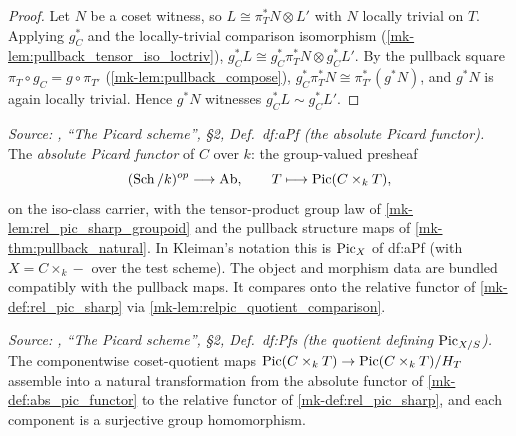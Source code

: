 \begin{proof}
  \leanok{}
  Let \(N\) be a coset witness, so \(L \cong \pi_T^* N \otimes L'\) with
  \(N\) locally trivial on \(T\). Applying \(g_C^*\) and the locally-trivial
  comparison isomorphism (\ref{mk-lem:pullback_tensor_iso_loctriv}),
  \(g_C^* L \cong g_C^* \pi_T^* N \otimes g_C^* L'\). By the pullback square
  \(\pi_T \circ g_C = g \circ \pi_{T'}\) (\ref{mk-lem:pullback_compose}),
  \(g_C^* \pi_T^* N \cong \pi_{T'}^* (g^* N)\), and \(g^* N\) is again
  locally trivial. Hence \(g^* N\) witnesses \(g_C^* L \sim g_C^* L'\).
\end{proof}

\begin{definition}\label{mk-def:abs_pic_functor}
  \leanok

  \textit{Source: \cite{kleiman-picard}, ``The Picard scheme'', \S 2, Def.~df:aPf
  (the absolute Picard functor).}
  The \emph{absolute Picard functor} of \(C\) over \(k\): the group-valued
  presheaf
  \[
    (\operatorname{Sch}/k)^{op} \longrightarrow \mathrm{Ab}, \qquad
    T \longmapsto \operatorname{Pic}(C \times_k T),
  \]
  on the iso-class carrier, with the tensor-product group law of
  \ref{mk-lem:rel_pic_sharp_groupoid} and the pullback structure maps of
  \ref{mk-thm:pullback_natural}. In Kleiman's notation this is \(\operatorname{Pic}_X\)
  of df:aPf (with \(X = C \times_k -\) over the test scheme).
  The object and morphism data are bundled compatibly with the pullback maps. It
  compares onto the relative functor of \ref{mk-def:rel_pic_sharp}
  via \ref{mk-lem:relpic_quotient_comparison}.
\end{definition}

\begin{lemma}\label{mk-lem:relpic_quotient_comparison}
  \leanok

  \textit{Source: \cite{kleiman-picard}, ``The Picard scheme'', \S 2, Def.~df:Pfs
  (the quotient defining \(\operatorname{Pic}_{X/S}\)).}
  The componentwise coset-quotient maps
  \(\operatorname{Pic}(C \times_k T) \to \operatorname{Pic}(C \times_k T)/H_T\) assemble into a natural
  transformation from the absolute functor of \ref{mk-def:abs_pic_functor} to
  the relative functor of \ref{mk-def:rel_pic_sharp}, and each
  component is a surjective group homomorphism.
\end{lemma}

